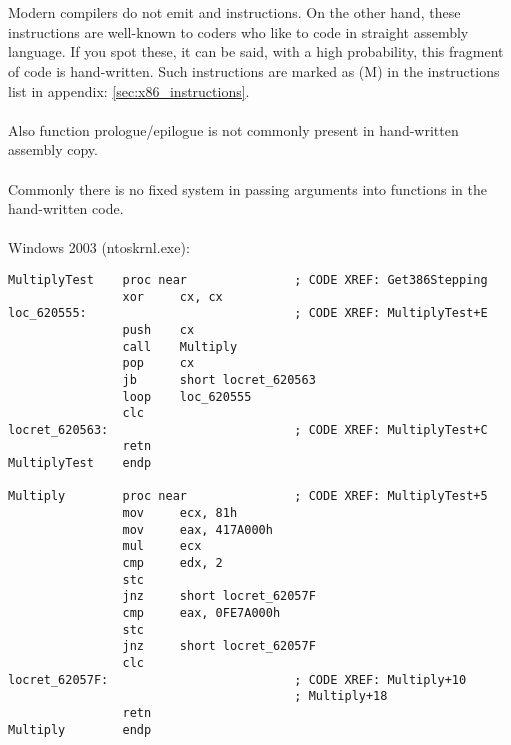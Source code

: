 \section{}

{Modern compilers do not emit  and  instructions.
On the other hand, these instructions are well-known to coders who like to code in straight assembly language.
If you spot these, it can be said, with a high probability, this fragment of code is hand-written.
Such instructions are marked as (M) in the instructions list in appendix: \ref{sec:x86_instructions}.}\\
\\
{Also function prologue/epilogue is not commonly present in hand-written assembly copy.}\\
\\
{Commonly there is no fixed system in passing arguments into functions in the hand-written
code}.\\
\\
 Windows 2003 
(ntoskrnl.exe):

\begin{lstlisting}
MultiplyTest    proc near               ; CODE XREF: Get386Stepping
                xor     cx, cx
loc_620555:                             ; CODE XREF: MultiplyTest+E
                push    cx
                call    Multiply
                pop     cx
                jb      short locret_620563
                loop    loc_620555
                clc
locret_620563:                          ; CODE XREF: MultiplyTest+C
                retn
MultiplyTest    endp

Multiply        proc near               ; CODE XREF: MultiplyTest+5
                mov     ecx, 81h
                mov     eax, 417A000h
                mul     ecx
                cmp     edx, 2
                stc
                jnz     short locret_62057F
                cmp     eax, 0FE7A000h
                stc
                jnz     short locret_62057F
                clc
locret_62057F:                          ; CODE XREF: Multiply+10
                                        ; Multiply+18
                retn
Multiply        endp
\end{lstlisting}

